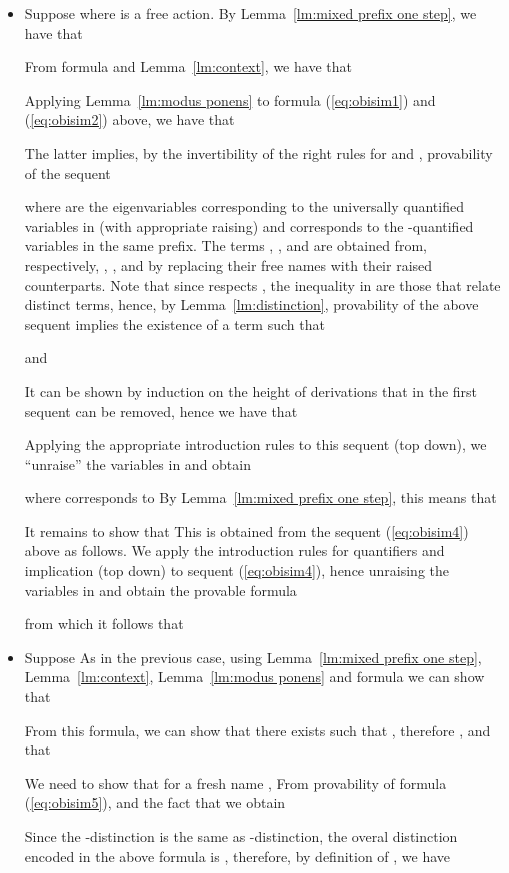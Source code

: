 \documentclass{acmtrans2m}
\begin{document}
\begin{itemize}
\item Suppose  where  is a free action. 
By Lemma~\ref{lm:mixed prefix one step}, we have that 

From formula  and Lemma~\ref{lm:context}, we have that

Applying Lemma~\ref{lm:modus ponens} to formula (\ref{eq:obisim1}) and (\ref{eq:obisim2}) above,
we have that 

The latter implies, by the invertibility of the right rules for  and ,
provability of the sequent

where  are the eigenvariables corresponding to the universally quantified variables in 
(with appropriate raising) and  corresponds to the -quantified variables
in the same prefix. The terms , ,  and  are obtained from, respectively,  
, ,  and  by replacing their free names with their raised counterparts.
Note that since  respects , the inequality in  are those that relate
distinct terms, hence, by Lemma~\ref{lm:distinction}, provability of the above sequent implies
the existence of a term  such that 

and

It can be shown by induction on the height of derivations that  in the first sequent can
be removed, hence we have that

Applying the appropriate introduction rules to this sequent (top down), we 
``unraise'' the variables in  and obtain 

where  corresponds to  By Lemma~\ref{lm:mixed prefix one step}, this means that 

It remains to show that  This is obtained from the sequent
(\ref{eq:obisim4}) above as follows. 
We apply the introduction rules for quantifiers and implication (top down) to sequent (\ref{eq:obisim4}), 
hence unraising the variables in  and obtain the provable formula

from which it follows that 

\item Suppose 
As in the previous case, using Lemma~\ref{lm:mixed prefix one step}, Lemma~\ref{lm:context}, 
Lemma~\ref{lm:modus ponens} and formula 
we can show that 

From this formula, we can show that there exists  such that ,
therefore , and that 

We need to show that for a fresh name ,  
From provability of formula (\ref{eq:obisim5}), and the fact that
 we obtain

Since the -distinction is the same as -distinction,
the overal distinction encoded in the above formula is , therefore, by definition
of , we have 
 


\end{itemize}
\end{document}

